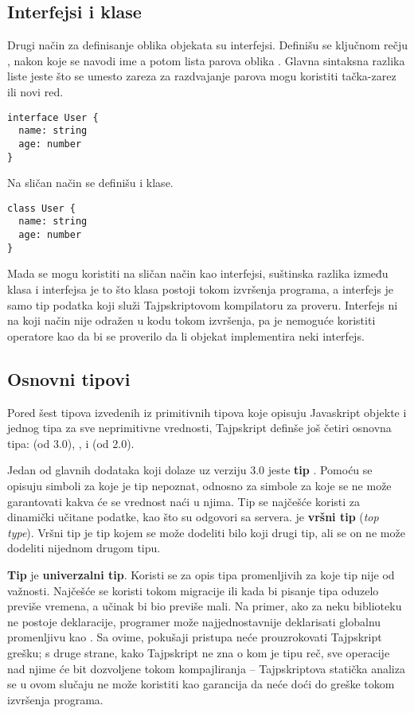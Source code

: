 \subsection{Interfejsi i klase}

Drugi način za definisanje oblika objekata su interfejsi.
Definišu se ključnom rečju , nakon koje se navodi ime a potom lista parova oblika .
Glavna sintaksna razlika liste jeste što se umesto zareza za razdvajanje parova mogu koristiti tačka-zarez ili novi red.

\begin{verbatim}
interface User {
  name: string
  age: number
}
\end{verbatim}

Na sličan način se definišu i klase.

\begin{verbatim}
class User {
  name: string
  age: number
}
\end{verbatim}

Mada se mogu koristiti na sličan način kao interfejsi, suštinska razlika između klasa i interfejsa je to što klasa postoji tokom izvršenja programa, a interfejs je samo tip podatka koji služi Tajpskriptovom kompilatoru za proveru.
Interfejs ni na koji način nije odražen u kodu tokom izvršenja, pa je nemoguće koristiti operatore kao  da bi se proverilo da li objekat implementira neki interfejs.

\subsection{Osnovni tipovi}

Pored šest tipova izvedenih iz primitivnih tipova koje opisuju Javaskript objekte i jednog tipa za sve neprimitivne vrednosti, Tajpskript definše još četiri osnovna tipa:  (od 3.0), ,  i  (od 2.0).

Jedan od glavnih dodataka koji dolaze uz verziju 3.0 jeste \textbf{tip }.
Pomoću  se opisuju simboli za koje je tip nepoznat, odnosno za simbole za koje se ne može garantovati kakva će se vrednost naći u njima.
Tip  se najčešće koristi za dinamički učitane podatke, kao što su odgovori sa servera.
 je \textbf{vršni tip} (\textit{top type}).
Vršni tip je tip kojem se može dodeliti bilo koji drugi tip, ali se on ne može dodeliti nijednom drugom tipu.

\textbf{Tip } je \textbf{univerzalni tip}.
Koristi se za opis tipa promenljivih za koje tip nije od važnosti.
Najčešće se koristi tokom migracije ili kada bi pisanje tipa oduzelo previše vremena, a učinak bi bio previše mali.
Na primer, ako za neku biblioteku ne postoje deklaracije, programer može najjednostavnije deklarisati globalnu promenljivu kao .
Sa ovime, pokušaji pristupa  neće prouzrokovati Tajpskript grešku; s druge strane, kako Tajpskript ne zna o kom je tipu reč, sve operacije nad njime će bit dozvoljene tokom kompajliranja -- Tajpskriptova statička analiza se u ovom slučaju ne može koristiti kao garancija da neće doći do greške tokom izvršenja programa.

